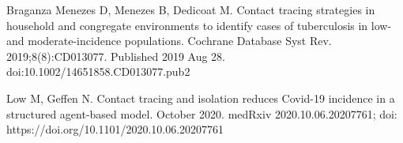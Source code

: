 \documentclass{article}
\begin{document}
\begin{thebibliography}{1}
  Braganza Menezes D, Menezes B, Dedicoat M.
  \newblock Contact tracing strategies in household and congregate environments
  to identify cases of tuberculosis in low- and moderate-incidence populations.
  \newblock Cochrane Database Syst Rev. 2019;8(8):CD013077. Published 2019 Aug 28.
  \newblock doi:10.1002/14651858.CD013077.pub2

  Low M, Geffen N.
  \newblock Contact tracing and isolation reduces Covid-19 incidence in a
  structured agent-based model.
   October 2020. medRxiv 2020.10.06.20207761; doi: https://doi.org/10.1101/2020.10.06.20207761

\end{thebibliography}
\end{document}
